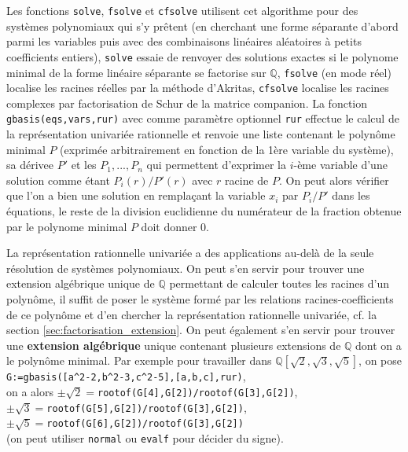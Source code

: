 \documentclass[a4paper,11pt]{article}
\newcommand{\Q}{{\mathbb{Q}}}
\begin{document}
\begin{giacjshere}
Les fonctions \verb|solve|, \verb|fsolve| et \verb|cfsolve| 
utilisent cet algorithme
pour des systèmes polynomiaux qui s'y prêtent (en cherchant une
forme séparante d'abord parmi les variables puis avec des combinaisons
linéaires aléatoires à petits coefficients entiers),
\verb|solve| essaie de renvoyer des solutions exactes
si le polynome minimal de la forme lin\'eaire s\'eparante
se factorise sur $\Q$, \verb|fsolve| (en mode r\'eel)
localise les racines r\'eelles par la m\'ethode d'Akritas,
\verb|cfsolve| localise les racines complexes par
factorisation de Schur de la matrice companion. La fonction
\verb|gbasis(eqs,vars,rur)| avec comme paramètre optionnel \verb|rur|
effectue le calcul de la repr\'esentation univari\'ee rationnelle
et renvoie une liste contenant le polynôme minimal $P$
(exprimée arbitrairement en fonction de la 1ère variable du système),
sa dérivee $P'$ et les $P_1,...,P_n$ qui permettent d'exprimer
la $i$-ème variable d'une solution comme étant $P_i(r)/P'(r)$
avec $r$ racine de $P$. On peut alors
vérifier que l'on a bien une solution en remplaçant la variable
$x_i$ par $P_i/P'$ dans les équations, le reste de la division
euclidienne du numérateur de la fraction obtenue par le polynome 
minimal $P$ doit donner 0.

La repr\'esentation rationnelle univari\'ee a des applications
au-del\`a de la seule r\'esolution de syst\`emes polynomiaux.
On peut s'en servir pour trouver une extension alg\'ebrique unique de
$\Q$ permettant de calculer toutes les racines d'un polyn\^ome, 
il suffit de poser le syst\`eme form\'e par les relations
racines-coefficients de ce polyn\^ome et d'en chercher la
repr\'esentation rationnelle univari\'ee, cf. la section 
\ref{sec:factorisation_extension}.
On peut \'egalement s'en servir pour trouver une 
{\bf extension
alg\'ebrique} 
unique contenant plusieurs extensions de $\Q$
dont on a le polyn\^ome minimal. Par exemple pour
travailler dans $\Q[\sqrt{2},\sqrt{3},\sqrt{5}]$, on pose \\
\verb|G:=gbasis([a^2-2,b^2-3,c^2-5],[a,b,c],rur)|,\\
on a alors $\pm \sqrt{2}=$\verb|rootof(G[4],G[2])/rootof(G[3],G[2])|,\\
$\pm \sqrt{3}=$\verb|rootof(G[5],G[2])/rootof(G[3],G[2])|,\\
$\pm \sqrt{5}=$\verb|rootof(G[6],G[2])/rootof(G[3],G[2])|\\
(on peut utiliser \verb|normal| ou \verb|evalf| pour d\'ecider du signe).


\end{giacjshere}
\end{document}
